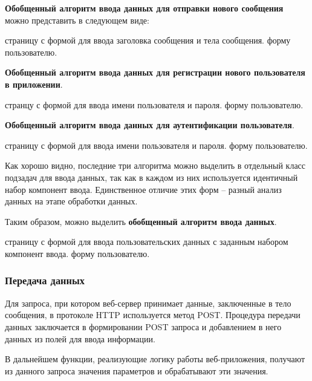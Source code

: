 \documentclass[a4paper]{article}
\begin{document}
\textbf{Обобщенный алгоритм ввода данных для отправки нового сообщения} можно представить в следующем виде:

\begin{enumerate}
 страницу с формой для ввода заголовка сообщения и тела сообщения.
 форму пользователю.
\end{enumerate}

\textbf{Обобщенный алгоритм ввода данных для регистрации нового пользователя в приложении}.

\begin{enumerate}
 странцу с формой для ввода имени пользователя и пароля.
 форму пользователю.
\end{enumerate}

\textbf{Обобщенный алгоритм ввода данных для аутентификации пользователя}.

\begin{enumerate}
 страницу с формой для ввода имени пользователя и пароля.
 форму пользователю.
\end{enumerate}

Как хорошо видно, последние три алгоритма можно выделить в отдельный класс подзадач для ввода данных, так как в каждом из них используется идентичный набор компонент ввода. Единственное отличие этих форм -- разный анализ данных на этапе обработки данных.

Таким образом, можно выделить \textbf{обобщенный алгоритм ввода данных}.

\begin{enumerate}
 страницу с формой для ввода пользовательских данных с заданным набором компонент ввода.
 форму пользователю.
\end{enumerate}

\subsubsection{Передача данных}

Для запроса, при котором веб-сервер принимает данные, заключенные в тело сообщения, в протоколе HTTP используется метод POST. Процедура передачи данных заключается в формировании POST запроса и добавлением в него данных из полей для ввода информации.

В дальнейшем функции, реализующие логику работы веб-приложения, получают из данного запроса значения параметров и обрабатывают эти значения.
\end{document}
